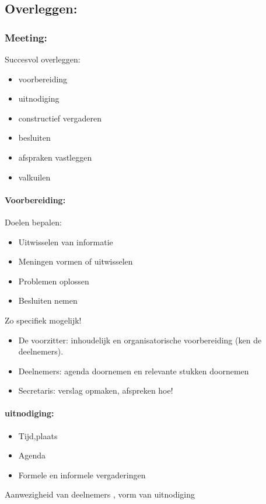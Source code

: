 \documentclass[12pt]{article}
\begin{document}
\subsection{Overleggen:}
\subsubsection{Meeting:}
Succesvol overleggen:
\begin{itemize}
    \item voorbereiding
    \item uitnodiging
    \item constructief vergaderen 
    \item besluiten 
    \item afspraken vastleggen 
    \item valkuilen
\end{itemize}
\paragraph{Voorbereiding:}
Doelen bepalen:\begin{itemize}
    \item Uitwisselen van informatie 
    \item Meningen vormen of uitwisselen 
    \item Problemen oplossen 
    \item Besluiten nemen
\end{itemize}
Zo specifiek mogelijk!
\begin{itemize}
    \item De voorzitter: inhoudelijk en organisatorische voorbereiding (ken de deelnemers).
    \item Deelnemers: agenda doornemen en relevante stukken doornemen
    \item Secretaris: verslag opmaken, afspreken hoe!
\end{itemize}
\paragraph{uitnodiging:}
\begin{itemize}
    \item Tijd,plaats 
    \item Agenda 
    \item Formele en informele vergaderingen
\end{itemize}
Aanwezigheid van deelnemers , vorm van uitnodiging
\end{document}
